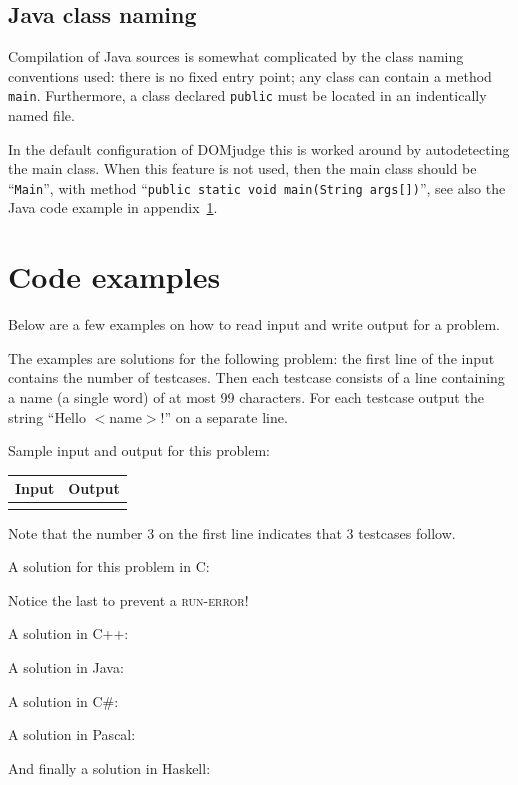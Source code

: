 \subsection{Java class naming}

Compilation of Java sources is somewhat complicated by the class
naming conventions used: there is no fixed entry point; any class can
contain a method \texttt{main}. Furthermore, a class declared
\texttt{public} must be located in an indentically named file.

In the default configuration of DOMjudge this is worked around by
autodetecting the main class. When this feature is not used, then
the main class should be ``\verb!Main!'', with method
``\verb!public static void main(String args[])!'', see also the Java
code example in appendix~\ref{codeexamples}.

\newpage
\appendix

\section{Code examples}\label{codeexamples}

Below are a few examples on how to read input and write output for a
problem.

The examples are solutions for the following problem: the first line
of the input contains the number of testcases. Then each testcase
consists of a line containing a name (a single word) of at most 99
characters. For each testcase output the string ``Hello $<$name$>$!''
on a separate line.

Sample input and output for this problem:

\begin{tabular}{|p{}|p{}|}
\hline
\textbf{Input} & \textbf{Output} \\
\hline
 &
 \\
\hline
\end{tabular}

Note that the number 3 on the first line indicates that 3 testcases
follow.

A solution for this problem in C:

Notice the last  to prevent a \textsc{run-error}!

\newpage

A solution in C++:

A solution in Java:

\newpage

A solution in C\#:

A solution in Pascal:

And finally a solution in Haskell:


